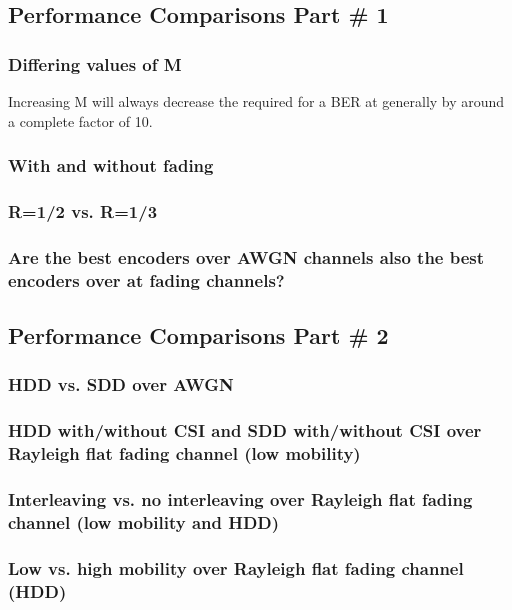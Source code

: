 \documentclass[a4paper,10pt]{article}
\begin{document}
\subsection{Performance Comparisons Part \# 1}

\subsubsection{Differing values of M}
Increasing M will always decrease the required \ebno for a BER at \ber generally by around a complete factor of 10. 
\subsubsection{With and without fading}

\subsubsection{R=1/2 vs. R=1/3}

\subsubsection{Are the best encoders over AWGN channels also the best encoders over at fading
channels?}


\subsection{Performance Comparisons Part \# 2}

\subsubsection{HDD vs. SDD over AWGN}




\subsubsection{HDD with/without CSI and SDD with/without CSI over Rayleigh flat fading channel (low mobility)}


\subsubsection{Interleaving vs. no interleaving over Rayleigh flat fading channel (low mobility and HDD)}


\subsubsection{Low vs. high mobility over Rayleigh flat fading channel (HDD)}



\end{document}
